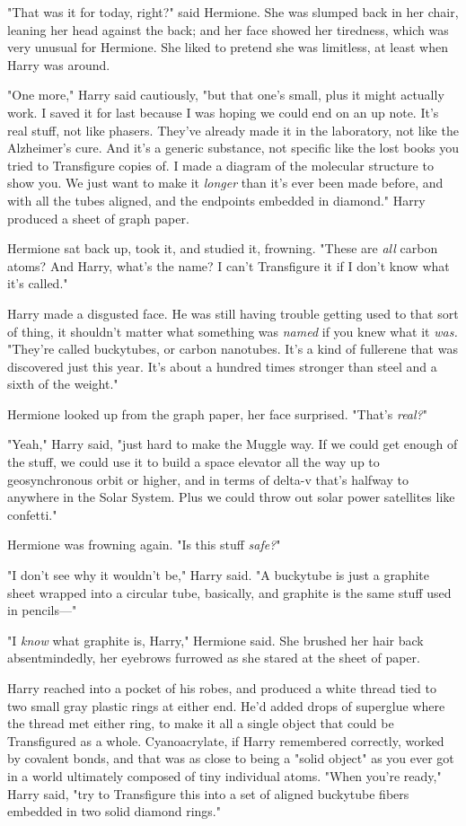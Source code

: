 "That was it for today, right?" said Hermione. She was slumped back in her 
chair, leaning her head against the back; and her face showed her tiredness, 
which was very unusual for Hermione. She liked to pretend she was limitless, at 
least when Harry was around.

"One more," Harry said cautiously, "but that one's small, plus it might 
actually work. I saved it for last because I was hoping we could end on an up 
note. It's real stuff, not like phasers. They've already made it in the 
laboratory, not like the Alzheimer's cure. And it's a generic substance, not 
specific like the lost books you tried to Transfigure copies of. I made a 
diagram of the molecular structure to show you. We just want to make it 
\emph{longer} than it's ever been made before, and with all the tubes aligned, 
and the endpoints embedded in diamond." Harry produced a sheet of graph paper.

Hermione sat back up, took it, and studied it, frowning. "These are \emph{all} 
carbon atoms? And Harry, what's the name? I can't Transfigure it if I don't 
know what it's called."

Harry made a disgusted face. He was still having trouble getting used to that 
sort of thing, it shouldn't matter what something was \emph{named} if you knew 
what it \emph{was.} "They're called buckytubes, or carbon nanotubes. It's a 
kind of fullerene that was discovered just this year. It's about a hundred 
times stronger than steel and a sixth of the weight."

Hermione looked up from the graph paper, her face surprised. "That's 
\emph{real?}"

"Yeah," Harry said, "just hard to make the Muggle way. If we could get enough 
of the stuff, we could use it to build a space elevator all the way up to 
geosynchronous orbit or higher, and in terms of delta-v that's halfway to 
anywhere in the Solar System. Plus we could throw out solar power satellites 
like confetti."

Hermione was frowning again. "Is this stuff \emph{safe?}"

"I don't see why it wouldn't be," Harry said. "A buckytube is just a graphite 
sheet wrapped into a circular tube, basically, and graphite is the same stuff 
used in pencils---"

"I \emph{know} what graphite is, Harry," Hermione said. She brushed her hair 
back absentmindedly, her eyebrows furrowed as she stared at the sheet of paper.

Harry reached into a pocket of his robes, and produced a white thread tied to 
two small gray plastic rings at either end. He'd added drops of superglue where 
the thread met either ring, to make it all a single object that could be 
Transfigured as a whole. Cyanoacrylate, if Harry remembered correctly, worked 
by covalent bonds, and that was as close to being a "solid object" as you ever 
got in a world ultimately composed of tiny individual atoms. "When you're 
ready," Harry said, "try to Transfigure this into a set of aligned buckytube 
fibers embedded in two solid diamond rings."

